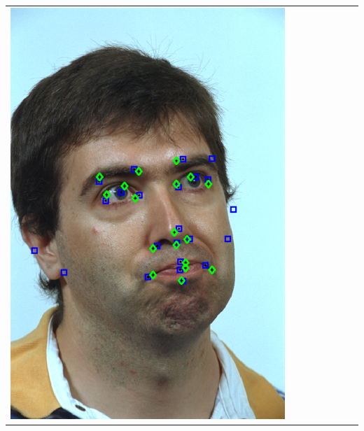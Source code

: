 \documentclass[landscape,final,a0paper,fontscale=0.27065]{baposter}
\begin{document}
\begin{poster}
{{\begin{tabular}{@{}rccccccc@{}}
 \parbox[c]{0.11\linewidth}{\includegraphics[width=\linewidth]{images/l_rc_success_2.pdf}} \\
 \midrule
 \begin{sideways}\end{sideways} &

\end{tabular}}}
\end{poster}
\end{document}
